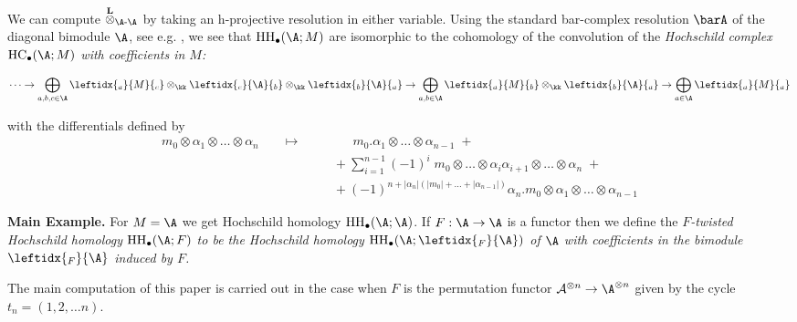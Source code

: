 \documentclass[12pt,a4paper,reqno]{amsart}
\DeclareMathOperator{\lder}{\bf L}
\DeclareMathOperator{\ldertimes}{\overset{\lder}{\otimes}}
\DeclareMathOperator{\hochhom}{{HH}}
\DeclareMathOperator{\hochcx}{{HC}}
\begin{document}
\medskip
\noindent
We can compute $\ldertimes_{\A\text{-}\A}$ by taking an h-projective
resolution in either variable. Using the standard bar-complex
resolution $\barA$ of the diagonal bimodule $\A$, see e.g. 
\cite[Section~2.11]{AnnoLogvinenko-BarCategoryOfModulesAndHomotopyAdjunctionForTensorFunctors},
we see that  $\hochhom_\bullet(\A;M)$ are isomorphic to the cohomology
of the convolution of the \em Hochschild complex 
$\hochcx_\bullet(\A;M)$ with coefficients in $M$\rm:
\begin{small}
	\begin{equation}
		\label{eqn-hochschild-complex-of-a-category-with-coefficients-in-bimod}
		\dots
		\rightarrow 
		\bigoplus_{a,b,c \in \A} 
		\leftidx{_a}{M}{_c}
		\otimes_\kk
		\leftidx{_c}{\A}{_b}
		\otimes_\kk
		\leftidx{_b}{\A}{_a}
		\rightarrow 
		\bigoplus_{a,b \in \A} 
		\leftidx{_a}{M}{_b}
		\otimes_\kk
		\leftidx{_b}{\A}{_a}
		\rightarrow 
		\bigoplus_{a \in \A} 
		\leftidx{_a}{M}{_a}
	\end{equation}
\end{small}
with the differentials defined by 
\begin{align*}
	m_0 \otimes \alpha_1 \otimes \dots \otimes \alpha_n 
	& \quad \mapsto \quad 
	\quad \quad \quad  m_0.\alpha_1 \otimes \dots
	\otimes \alpha_{n-1}\; +
	\\
	& \quad \quad \quad \quad \quad + \sum_{i = 1}^{n-1} (-1)^i \; m_0 \otimes \dots \otimes \alpha_{i} \alpha_{i+1}
	\otimes \dots \otimes \alpha_n\; + \\ 
	& \quad \quad \quad \quad \quad + (-1)^{n + |\alpha_n|(|m_0| + \dots +
		|\alpha_{n-1}|)} \alpha_n.m_0 \otimes \alpha_1 \otimes \dots
	\otimes \alpha_{n-1}
\end{align*}




 \bigskip
 \noindent
 \textbf{Main Example.} For $M = \A$ we get Hochschild homology 
  $\hochhom_\bullet(\A; \A)$. If $F: \A \to \A$ is a functor then 
we define the \em $F$-twisted Hochschild homology $\hochhom_\bullet(\A;F)$ \rm 
to be the Hochschild homology $\hochhom_\bullet(\A;\leftidx{_F}{\A})$
of $\A$ with coefficients in the bimodule $\leftidx{_F}{\A}$ induced by $F$.   

The main computation of this paper is carried out in the case when 
$F$ is the permutation functor $\mathcal{A}^{\otimes n} \to \A^{\otimes n}$
given by the cycle $t_n = (1, 2, \ldots n)$. 
\end{document}
